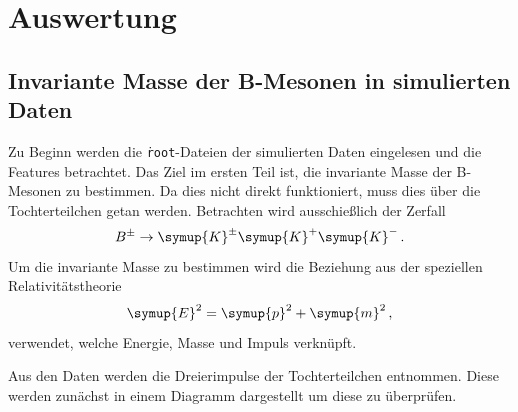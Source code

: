 \section{Auswertung}
\label{sec:auswertung}
\subsection{Invariante Masse der B-Mesonen in simulierten Daten}

Zu Beginn werden die \texttt{\.root}-Dateien der simulierten Daten eingelesen und die Features betrachtet.
Das Ziel im ersten Teil ist, die invariante Masse der B-Mesonen zu bestimmen. Da dies nicht direkt funktioniert, muss dies \"uber die Tochterteilchen getan werden.
Betrachten wird ausschie\ss lich der Zerfall
\begin{equation}
  B^{\pm} \to \symup{K}^{\pm} \symup{K}^{+} \symup{K}^{-}\,.
\end{equation}
Um die invariante Masse zu bestimmen wird die Beziehung aus der speziellen Relativit\"atstheorie
\begin{equation}
  \symup{E}^2 = \symup{p}^2 + \symup{m}^2\,,
  \label{eqn:relativityEQ}
\end{equation}
verwendet, welche Energie, Masse und Impuls verkn\"upft.

Aus den Daten werden die Dreierimpulse der Tochterteilchen entnommen.
Diese werden zunächst in einem Diagramm dargestellt um diese zu überprüfen.

